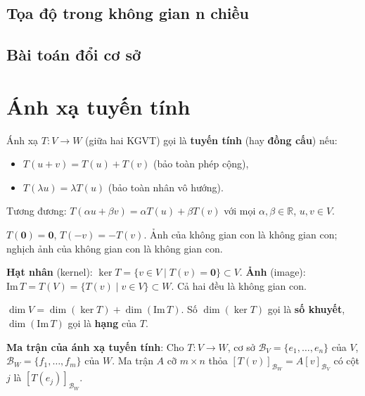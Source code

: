 \documentclass[12pt,a4paper]{article}
\begin{document}
\subsection{Tọa độ trong không gian n chiều}

\subsection{Bài toán đổi cơ sở}

\section{Ánh xạ tuyến tính}

\begin{dinhnghia}
  Ánh xạ $T: V \to W$ (giữa hai KGVT) gọi là \textbf{tuyến tính} (hay \textbf{đồng cấu}) nếu:
  \begin{itemize}
    \item $T(u + v) = T(u) + T(v)$ (bảo toàn phép cộng),
    \item $T(\lambda u) = \lambda T(u)$ (bảo toàn nhân vô hướng).
  \end{itemize}
  Tương đương: $T(\alpha u + \beta v) = \alpha T(u) + \beta T(v)$ với mọi $\alpha, \beta \in \mathbb{R}$, $u, v \in V$.
\end{dinhnghia}

\begin{tinhchat}
  $T(\mathbf{0}) = \mathbf{0}$, $T(-v) = -T(v)$. Ảnh của không gian con là không gian con; nghịch ảnh của không gian con là không gian con.
\end{tinhchat}

\begin{dinhnghia}
  \textbf{Hạt nhân} (kernel): $\ker T = \{v \in V \mid T(v) = \mathbf{0}\} \subset V$. \textbf{Ảnh} (image): $\mathrm{Im}\,T = T(V) = \{T(v) \mid v \in V\} \subset W$. Cả hai đều là không gian con.
\end{dinhnghia}

\begin{dinhly}[title={Định lý chiều}]
  $\dim V = \dim(\ker T) + \dim(\mathrm{Im}\,T)$. Số $\dim(\ker T)$ gọi là \textbf{số khuyết}, $\dim(\mathrm{Im}\,T)$ gọi là \textbf{hạng} của $T$.
\end{dinhly}

\begin{dinhnghia}
  \textbf{Ma trận của ánh xạ tuyến tính}: Cho $T: V \to W$, cơ sở $\mathcal{B}_V = \{e_1, \ldots, e_n\}$ của $V$, $\mathcal{B}_W = \{f_1, \ldots, f_m\}$ của $W$. Ma trận $A$ cỡ $m \times n$ thỏa $[T(v)]_{\mathcal{B}_W} = A [v]_{\mathcal{B}_V}$ có cột $j$ là $[T(e_j)]_{\mathcal{B}_W}$.
\end{dinhnghia}
\end{document}
